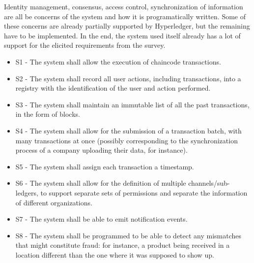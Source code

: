 		Identity management, consensus, access control, synchronization of information are all be concerns of the system and how it is programatically written. Some of these concerns are already partially supported by Hyperledger, but the remaining have to be implemented. In the end, the system used itself already has a lot of support for the elicited requirements from the survey.
		\begin{itemize}
			\item S1 - The system shall allow the execution of chaincode transactions.
			\item S2 - The system shall record all user actions, including transactions, into a registry with the identification of the user and action performed. %
			\item S3 - The system shall maintain an immutable list of all the past transactions, in the form of blocks.
			\item S4 - The system shall allow for the submission of a transaction batch, with many transactions at once (possibly corresponding to the synchronization process of a company uploading their data, for instance).
			\item S5 - The system shall assign each transaction a timestamp.
			\item S6 - The system shall allow for the definition of multiple channels/sub-ledgers, to support separate sets of permissions and separate the information of different organizations.%
			\item S7 - The system shall be able to emit notification events.
			\item S8 - The system shall be programmed to be able to detect any mismatches that might constitute fraud: for instance, a product being received in a location different than the one where it was supposed to show up.

\end{itemize}
